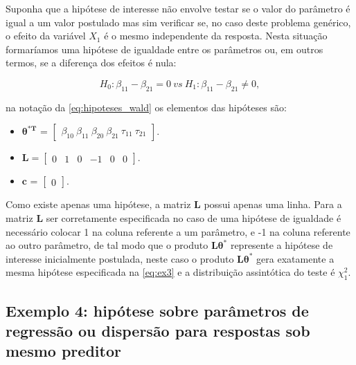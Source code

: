 Suponha que a hipótese de interesse não envolve testar se o valor do parâmetro é igual a um valor postulado mas sim verificar se, no caso deste problema genérico, o efeito da variável $X_1$ é o mesmo independente da resposta. Nesta situação formaríamos uma hipótese de igualdade entre os parâmetros ou, em outros termos, se a diferença dos efeitos é nula:

\begin{equation}
\label{eq:ex3}
H_0: \beta_{11} - \beta_{21} = 0 \ vs \ H_1: \beta_{11} - \beta_{21} \neq 0,
\end{equation}

\noindent na notação da \autoref{eq:hipoteses_wald} os elementos das hipóteses são:

\begin{itemize}
  
  \item $\boldsymbol{\theta^{*T}}$ = $\begin{bmatrix} \beta_{10} \  \beta_{11} \ \beta_{20} \ \beta_{21} \ \tau_{11} \ \tau_{21} \end{bmatrix}$.


\item $\boldsymbol{L} = \begin{bmatrix} 0 & 1 & 0 & -1 & 0 & 0  \end{bmatrix}.$
 
\item $\boldsymbol{c}$ = $\begin{bmatrix} 0 \end{bmatrix}.$ 

\end{itemize}

Como existe apenas uma hipótese, a matriz $\boldsymbol{L}$ possui apenas uma linha. Para a matriz $\boldsymbol{L}$ ser corretamente especificada no caso de uma hipótese de igualdade é necessário colocar 1 na coluna referente a um parâmetro, e -1 na coluna referente ao outro parâmetro, de tal modo que o produto $\boldsymbol{L}\boldsymbol{\theta^{*}}$ represente a hipótese de interesse inicialmente postulada, neste caso o produto $\boldsymbol{L}\boldsymbol{\theta^{*}}$ gera exatamente a mesma hipótese especificada na \autoref{eq:ex3} e a distribuição assintótica do teste é $\chi^2_1$.

\subsection{Exemplo 4: hipótese sobre parâmetros de regressão ou dispersão para respostas sob mesmo preditor}\label{sec:sec_ex4}

